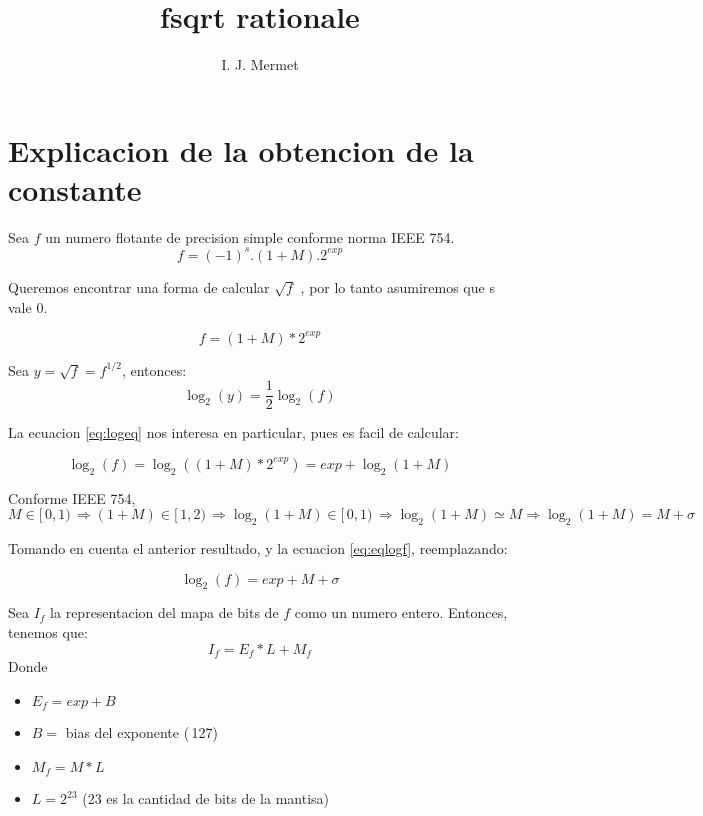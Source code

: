 \documentclass[]{article}
\title{fsqrt rationale}
\author{I. J. Mermet}
\begin{document}
	
	\maketitle
	
	\section{Explicacion de la obtencion de la constante}
Sea \(f\) un numero flotante de precision simple conforme norma IEEE 754.
\begin{equation}
f = (-1)^{s}.(1+M).2^{exp}
\end{equation}

Queremos encontrar una forma de calcular \(\sqrt{f}\) , por lo tanto asumiremos que s vale 0.

\begin{equation}
f = (1 + M)*2^{exp}
\end{equation}

Sea \(y=\sqrt{f}=f^{1/2}\), entonces:
\begin{equation} \label{eq:logeq}
\log_2(y)=\frac{1}{2}\log_2(f)
\end{equation}

La ecuacion \eqref{eq:logeq} nos interesa en particular, pues es facil de calcular:

\begin{equation} \label{eq:eqlogf}
	\log_2(f) = \log_2((1 + M)*2^{exp}) = exp + \log_2(1+M)
\end{equation}

Conforme IEEE 754, \(M \in [\,0,1)\,\Rightarrow (1+M)\in[\,1,2)\,\Rightarrow\log_2(1+M)\in[\,0,1)\,\Rightarrow\log_2(1+M)\simeq M\Rightarrow\log_2(1+M)=M+\sigma \)

Tomando en cuenta el anterior resultado, y la ecuacion \eqref{eq:eqlogf}, reemplazando:

\begin{equation}
\log_2(f)=exp+M+\sigma
\end{equation}


Sea \(I_f\) la representacion del mapa de bits de \(f\) como un numero entero. Entonces, tenemos que:
\begin{equation}
I_f = E_f * L + M_f
\end{equation}
Donde \begin{itemize}
	\item \(E_f = exp + B\)
	\item \(B =\) bias del exponente (\,127)\,
	\item \(M_f = M * L\)
	\item \(L = 2^{23}\) (23 es la cantidad de bits de la mantisa)
\end{itemize}
\end{document}

